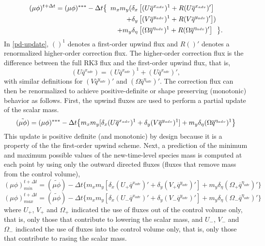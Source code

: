 \begin{align}
(\mu\phi)^{t+\Delta t} = (\mu\phi)^{***} - {\Delta t}\bigl\{ \,\,\,
m_x m_y ( \delta_x &\left[ (U \overline{q}^{x_{adv}})^1 
+ R(U \overline{q}^{x_{adv}})' \right] 
\notag
\\
+\delta_y &\left[(V\overline{q}^{y_{adv}})^1 
+ R(V\overline{q}^{y_{adv}})'\right] )
\notag
\\
+ m_y \delta_\eta &\left[
(\Omega \overline{q}^{\eta_{adv}})^1 + R(\Omega \overline{q}^{\eta_{adv}})' \right]
\,\,\,\, \bigr\}.
\label{pd-update}
\end{align}
%
In \eqref{pd-update}, $()^1$ denotes a first-order upwind flux and $R()'$
denotes a renormalized higher-order correction flux.  The higher-order
correction flux is the difference between the full RK3 flux and the
first-order upwind flux, that is,
%
\begin{equation}
(U \overline{q}^{x_{adv}}) = (U \overline{q}^{x_{adv}})^1 + (U
\overline{q}^{x_{adv}})',
\label{correction-def}
\end{equation}
%
with similar definitions for $(V \overline{q}^{y_{adv}})'$ 
and $(\Omega \overline{q}^{\eta_{adv}})'$.  The correction flux can then be
renormalized to achieve positive-definite or shape preserving (monotonic) behavior as follows.  
First, the upwind fluxes are used to perform a
partial update of the scalar mass.
%
\begin{equation}
(\tilde{\mu\phi}) = (\mu\phi)^{***} 
- {\Delta t} \bigl\{
m_x m_y [\delta_x (U \overline{q}^{x_{adv}})^1 
+ \delta_y (V\overline{q}^{y_{adv}})^1] 
+ m_y \delta_\eta
(\Omega \overline{q}^{\eta_{adv}})^1\bigr\}
\notag
\end{equation}
%
This update is positive definite (and monotonic) by design because it is a property of the
the first-order upwind scheme.  Next, a prediction of the minimum and maximum
possible values of the new-time-level species mass is computed at each
point by using only the outward directed fluxes (fluxes that remove mass
from the control volume),
%
\begin{equation}
(\mu\phi)_{min}^{t+\Delta t} = (\tilde{\mu\phi}) 
-{\Delta t} \bigl\{
m_x m_y [\delta_x (U_+ \overline{q}^{x_{adv}})' 
+ \delta_y (V_+\overline{q}^{y_{adv}})'] 
+ m_y \delta_\eta
(\Omega_+ \overline{q}^{\eta_{adv}})'\bigr\}
\label{min-prediction}
\end{equation}
%
\begin{equation}
(\mu\phi)_{max}^{t+\Delta t} = (\tilde{\mu\phi}) 
-{\Delta t} \bigl\{
m_x m_y [\delta_x (U_- \overline{q}^{x_{adv}})' 
+ \delta_y (V_-\overline{q}^{y_{adv}})'] 
+ m_y \delta_\eta
(\Omega_- \overline{q}^{\eta_{adv}})'\bigr\}
\label{max-prediction}
\end{equation}
%
where $U_+$, $V_+$ and $\Omega_+$ indicated the use of fluxes 
out of the control volume only, that is, only those that contribute to
lowering the scalar mass,
and $U_-$, $V_-$ and $\Omega_-$ indicated the use of fluxes 
into the control volume only, that is, only those that contribute to
rasing the scalar mass.  

